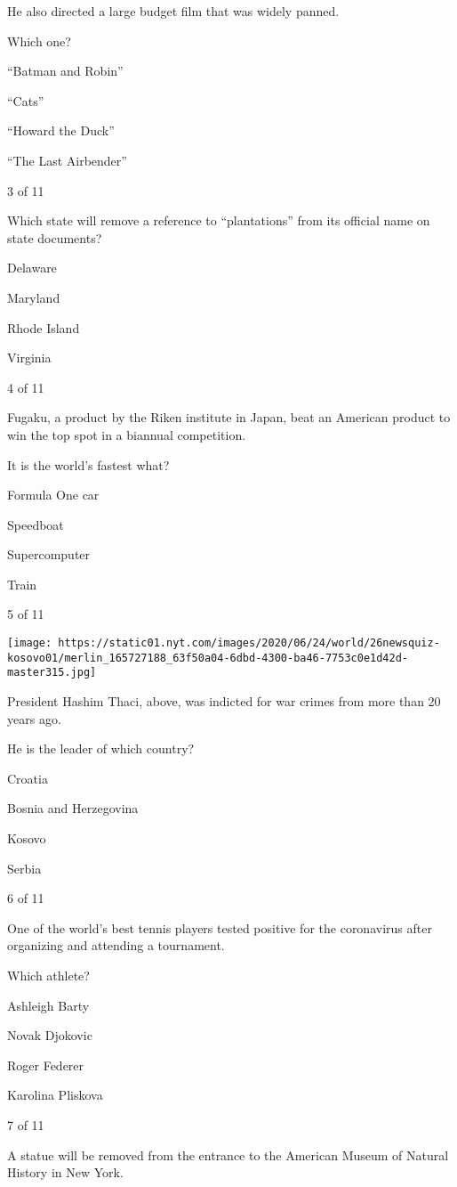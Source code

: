 He also directed a large budget film that was widely panned.

Which one?

``Batman and Robin''

``Cats''

``Howard the Duck''

``The Last Airbender''

3 of 11

Which state will remove a reference to ``plantations'' from its official
name on state documents?

Delaware

Maryland

Rhode Island

Virginia

4 of 11

Fugaku, a product by the Riken institute in Japan, beat an American
product to win the top spot in a biannual competition.

It is the world's fastest what?

Formula One car

Speedboat

Supercomputer

Train

5 of 11

\texttt{[image: https://static01.nyt.com/images/2020/06/24/world/26newsquiz-kosovo01/merlin\_165727188\_63f50a04-6dbd-4300-ba46-7753c0e1d42d-master315.jpg]}

President Hashim Thaci, above, was indicted for war crimes from more
than 20 years ago.

He is the leader of which country?

Croatia

Bosnia and Herzegovina

Kosovo

Serbia

6 of 11

One of the world's best tennis players tested positive for the
coronavirus after organizing and attending a tournament.

Which athlete?

Ashleigh Barty

Novak Djokovic

Roger Federer

Karolina Pliskova

7 of 11

A statue will be removed from the entrance to the American Museum of
Natural History in New York.

